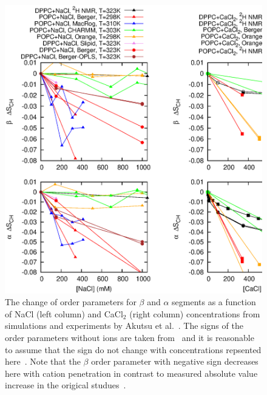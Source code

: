 \documentclass[pre,aps,floatfix,authordate1-4,twocolumn]{revtex4-1}
\begin{document}
\begin{figure}[]
  \centering
  \includegraphics[width=15cm]{../Fig/OrderParameterIONSchanges.eps}
  \caption{\label{ordPions}
    The change of order parameters for $\beta$ and $\alpha$ segments as a function of NaCl (left column) and CaCl$_2$ (right column) concentrations from simulations 
    and experiments by Akutsu et al.~\cite{akutsu81}. The signs of the order parameters without ions are taken from~\cite{hong95a,hong95b,gross97} and it is reasonable
    to assume that the sign do not change with concentrations repsented here~\cite{altenbach84}. Note that the $\beta$ order parameter with negative sign decreases here with cation
    penetration in contrast to measured absolute value increase in the origical studues~\cite{akutsu81,altenbach84}.
}
\end{figure}
\end{document}
